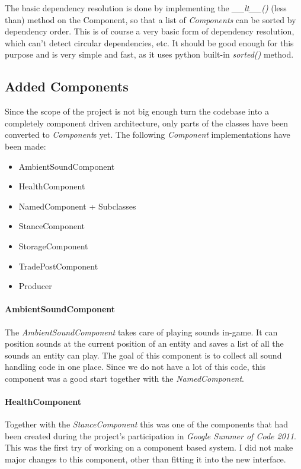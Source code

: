 The basic dependency resolution is done by implementing the \textit{\_\_lt\_\_()} (less than) method on the Component,
so that a list of \textit{Components} can be sorted by dependency order. This is of course a very basic form of
dependency resolution, which can't detect circular dependencies, etc. It should be good enough for this purpose and is very
simple and fast, as it uses python built-in \textit{sorted()} method.


\subsection{Added Components}
Since the scope of the project is not big enough turn the \UH{} codebase into a completely component driven
architecture, only parts of the classes have been converted to \textit{Component}s yet. The following \textit{Component}
implementations have been made:
\begin{itemize}
    \item AmbientSoundComponent
    \item HealthComponent
    \item NamedComponent + Subclasses
    \item StanceComponent
    \item StorageComponent
    \item TradePostComponent
    \item Producer
\end{itemize}

\paragraph{AmbientSoundComponent}
The \textit{AmbientSoundComponent} takes care of playing sounds in-game. It can position sounds at the current position
of an entity and saves a list of all the sounds an entity can play. The goal of this component is to collect all sound
handling code in one place. Since we do not have a lot of this code, this component was a good start together with the
\textit{NamedComponent}.

\paragraph{HealthComponent}
Together with the \textit{StanceComponent} this was one of the components that had been created during the project's
participation in \textit{Google Summer of Code 2011}. This was the first try of working on a component based system. I
did not make major changes to this component, other than fitting it into the new interface.

